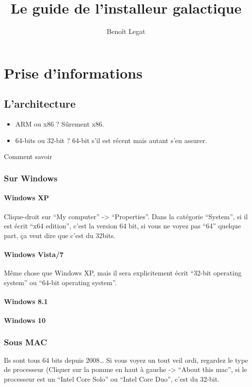 \documentclass{../guide}
\title{Le guide de l'installeur galactique}
\author{Benoît Legat}
\begin{document}
\maketitle

\section{Prise d'informations}
\subsection{L'architecture}
\begin{itemize}
  \item ARM ou x86 ? Sûrement x86.
  \item 64-bits ou 32-bit ? 64-bit s'il est récent mais autant s'en assurer.
\end{itemize}

Comment savoir
\subsubsection{Sur Windows}
\paragraph{Windows XP}
\todo[inline] Clique-droit sur ``My computer'' -> ``Properties''. Dans la catégorie ``System'', si il est écrit ``x64 edition'', c'est la version 64 bit, si vous ne voyez pas ``64'' quelque part, ça veut dire que c'est du 32bits.
\paragraph{Windows Vista/7}
\todo[inline] Même chose que Windows XP, mais il sera explicitement écrit ``32-bit operating system'' ou ``64-bit operating system''.
\paragraph{Windows 8.1}
\paragraph{Windows 10}
\subsubsection{Sous MAC}
\todo[inline] Ils sont tous 64 bits depuis 2008… Si vous voyez un tout veil ordi, regardez le type de processeur (Cliquer sur la pomme en haut à gauche -> ``About this mac'', si le processeur est un ``Intel Core Solo'' ou ``Intel Core Duo'', c'est du 32-bit.
\end{document}
